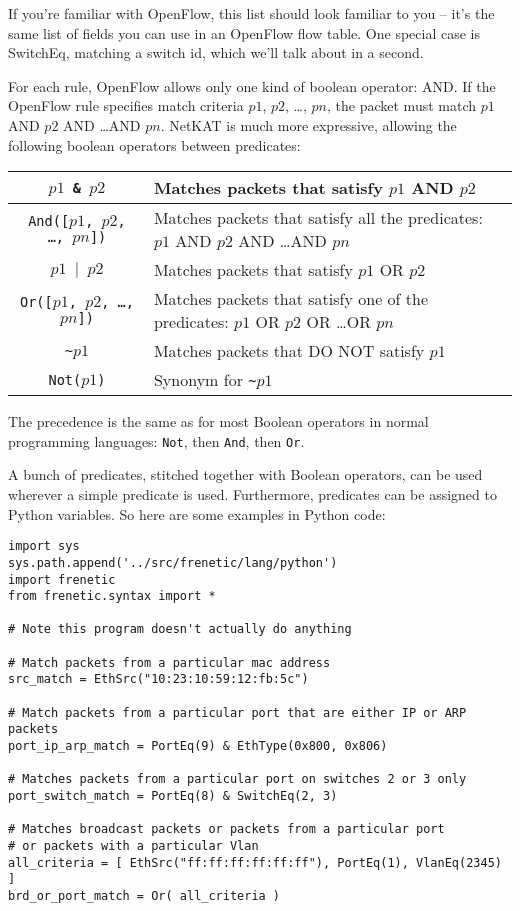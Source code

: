 \bigskip
If you're familiar with OpenFlow, this list should look familiar to you -- it's the same list of fields you can 
use in an OpenFlow flow table.
One special case is SwitchEq, matching a switch id, which we'll talk about in a second.  

For each rule, OpenFlow allows only one kind of boolean operator: AND.  
If the OpenFlow rule specifies match criteria $p1$, $p2$, \ldots, $pn$, the packet must match $p1$ AND $p2$
AND \ldots AND $pn$.  
NetKAT is much more expressive, allowing the following boolean operators between predicates:

\bigskip
\begin{tabularx}{6in}{|c|X|}
\hline\hline
\texttt{$p1$ \& $p2$} & Matches packets that satisfy $p1$ AND $p2$
\\ \hline  
\texttt{And([$p1$, $p2$, \ldots, $pn$])} & 
Matches packets that satisfy all the predicates: $p1$ AND $p2$ AND \ldots AND $pn$
\\ \hline  
\texttt{$p1$ $\vert$ $p2$} & Matches packets that satisfy $p1$ OR $p2$
\\ \hline  
\texttt{Or([$p1$, $p2$, \ldots, $pn$])} & 
Matches packets that satisfy one of the predicates: $p1$ OR $p2$ OR \ldots OR $pn$
\\ \hline  
\texttt{\textasciitilde $p1$} & Matches packets that DO NOT satisfy $p1$
\\ \hline  
\texttt{Not($p1$)} & Synonym for \texttt{\textasciitilde $p1$}
\\ \hline\hline
\end{tabularx}

\bigskip

The precedence is the same as for most Boolean operators in normal programming languages: 
\lstinline{Not}, then \lstinline{And}, then \lstinline{Or}.  

A bunch of predicates, stitched together with Boolean operators, can be used wherever a simple predicate is used.
Furthermore, predicates can be assigned to Python variables.
So here are some examples in Python code:

\begin{lstlisting}
import sys
sys.path.append('../src/frenetic/lang/python')
import frenetic
from frenetic.syntax import *

# Note this program doesn't actually do anything

# Match packets from a particular mac address
src_match = EthSrc("10:23:10:59:12:fb:5c")

# Match packets from a particular port that are either IP or ARP packets
port_ip_arp_match = PortEq(9) & EthType(0x800, 0x806)

# Matches packets from a particular port on switches 2 or 3 only
port_switch_match = PortEq(8) & SwitchEq(2, 3)

# Matches broadcast packets or packets from a particular port 
# or packets with a particular Vlan
all_criteria = [ EthSrc("ff:ff:ff:ff:ff:ff"), PortEq(1), VlanEq(2345) ] 
brd_or_port_match = Or( all_criteria ) 

\end{lstlisting}

